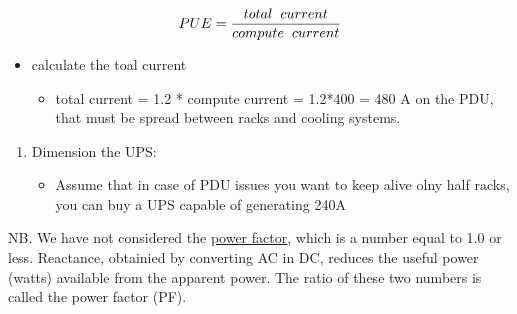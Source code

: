 $$PUE = \frac{total\hspace{0.2cm}current}{compute\hspace{0.2cm}current}$$

\begin{itemize}
\item
  calculate the toal current

  \begin{itemize}
  \item
    total current = 1.2 * compute current = 1.2*400 = 480 A on the PDU,
    that must be spread between racks and cooling systems.
  \end{itemize}
\end{itemize}

\begin{enumerate}
\def\labelenumi{\arabic{enumi}.}
\item
  Dimension the UPS:

  \begin{itemize}
  \item
    Assume that in case of PDU issues you want to keep alive olny half
    racks, you can buy a UPS capable of generating 240A
  \end{itemize}
\end{enumerate}

NB. We have not considered the \protect\hyperlink{power-factor}{power
factor}, which is a number equal to 1.0 or less. Reactance, obtainied by
converting AC in DC, reduces the useful power (watts) available from the
apparent power. The ratio of these two numbers is called the power
factor (PF).


